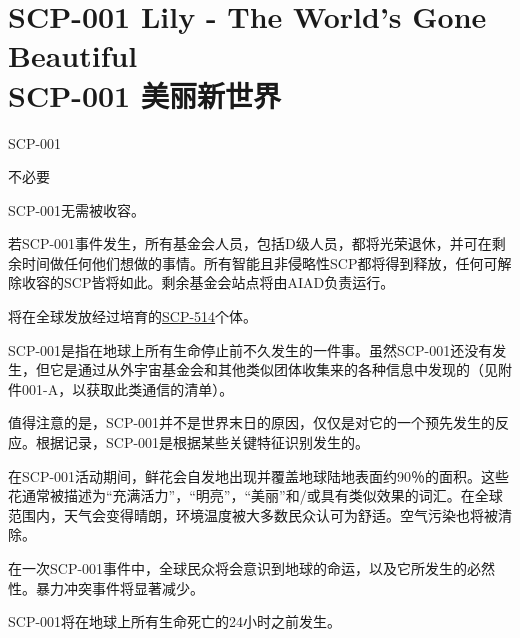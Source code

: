 \chapter[SCP-001 美丽新世界]{
    SCP-001 Lily - The World's Gone Beautiful\\
    SCP-001 美丽新世界
}

\label{chap:SCP-001.the.worlds.gone.beautiful}

SCP-001

不必要

SCP-001无需被收容。

若SCP-001事件发生，所有基金会人员，包括D级人员，都将光荣退休，并可在剩余时间做任何他们想做的事情。所有智能且非侵略性SCP都将得到释放，任何可解除收容的SCP皆将如此。剩余基金会站点将由AIAD负责运行。

将在全球发放经过培育的\hyperref[chap:SCP-514]{SCP-514}个体。

SCP-001是指在地球上所有生命停止前不久发生的一件事。虽然SCP-001还没有发生，但它是通过从外宇宙基金会和其他类似团体收集来的各种信息中发现的（见附件001-A，以获取此类通信的清单）。

值得注意的是，SCP-001并不是世界末日的原因，仅仅是对它的一个预先发生的反应。根据记录，SCP-001是根据某些关键特征识别发生的。

在SCP-001活动期间，鲜花会自发地出现并覆盖地球陆地表面约90％的面积。这些花通常被描述为“充满活力”，“明亮”，“美丽”和\slash 或具有类似效果的词汇。在全球范围内，天气会变得晴朗，环境温度被大多数民众认可为舒适。空气污染也将被清除。

在一次SCP-001事件中，全球民众将会意识到地球的命运，以及它所发生的必然性。暴力冲突事件将显著减少。

SCP-001将在地球上所有生命死亡的24小时之前发生。
